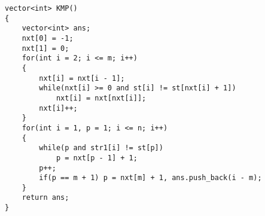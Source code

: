 \begin{lstlisting}
vector<int> KMP()
{
	vector<int> ans;
	nxt[0] = -1;
	nxt[1] = 0;
	for(int i = 2; i <= m; i++)
	{
		nxt[i] = nxt[i - 1];
		while(nxt[i] >= 0 and st[i] != st[nxt[i] + 1])
			nxt[i] = nxt[nxt[i]];
		nxt[i]++;
	}
	for(int i = 1, p = 1; i <= n; i++)
	{
		while(p and str1[i] != st[p])
			p = nxt[p - 1] + 1;
		p++;
		if(p == m + 1) p = nxt[m] + 1, ans.push_back(i - m);
	}
	return ans;
}
\end{lstlisting}
